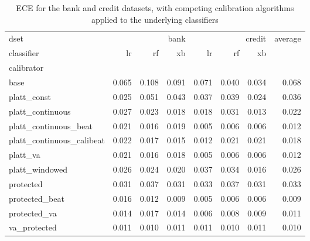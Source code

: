 \begin{table}
\caption{ECE for the bank and credit datasets, with competing calibration algorithms applied to the underlying classifiers}
\begin{tabular}{l|rrr|rrr|r|}
dset & \multicolumn{3}{r}{bank} & \multicolumn{3}{r}{credit} & average \\
classifier & lr & rf & xb & lr & rf & xb &  \\
calibrator &  &  &  &  &  &  &  \\
base & 0.065 & 0.108 & 0.091 & 0.071 & 0.040 & 0.034 & 0.068 \\
platt_const & 0.025 & 0.051 & 0.043 & 0.037 & 0.039 & 0.024 & 0.036 \\
platt_continuous & 0.027 & 0.023 & 0.018 & 0.018 & 0.031 & 0.013 & 0.022 \\
platt_continuous_beat & 0.021 & 0.016 & 0.019 & 0.005 & 0.006 & 0.006 & 0.012 \\
platt_continuous_calibeat & 0.022 & 0.017 & 0.015 & 0.012 & 0.021 & 0.021 & 0.018 \\
platt_va & 0.021 & 0.016 & 0.018 & 0.005 & 0.006 & 0.006 & 0.012 \\
platt_windowed & 0.026 & 0.024 & 0.020 & 0.037 & 0.034 & 0.016 & 0.026 \\
protected & 0.031 & 0.037 & 0.031 & 0.033 & 0.037 & 0.031 & 0.033 \\
protected_beat & 0.016 & 0.012 & 0.009 & 0.005 & 0.006 & 0.006 & 0.009 \\
protected_va & 0.014 & 0.017 & 0.014 & 0.006 & 0.008 & 0.009 & 0.011 \\
va_protected & 0.011 & 0.010 & 0.011 & 0.011 & 0.010 & 0.011 & 0.010 \\
\end{tabular}
\end{table}
